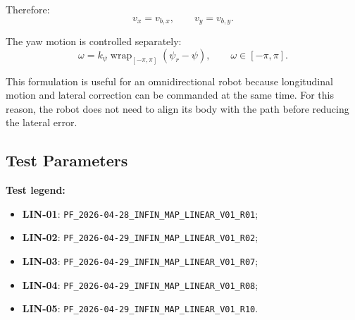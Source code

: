 Therefore:
\begin{equation}
    v_x = v_{b,x},
    \qquad
    v_y = v_{b,y}.
\end{equation}

The yaw motion is controlled separately:
\begin{equation}
    \omega
    =
    k_{\psi}
    \operatorname{wrap}_{[-\pi,\pi]}\!\left(\psi_{r}-\psi\right),
    \qquad
    \omega\in[-\pi,\pi].
\end{equation}

This formulation is useful for an omnidirectional robot because longitudinal
motion and lateral correction can be commanded at the same time. For this
reason, the robot does not need to align its body with the path before reducing
the lateral error.

\subsection{Test Parameters}

\noindent
  \textbf{Test legend:}
  \begin{itemize}
      \item \textbf{LIN-01}: \texttt{PF\_2026-04-28\_INFIN\_MAP\_LINEAR\_V01\_R01};
      \item \textbf{LIN-02}: \texttt{PF\_2026-04-29\_INFIN\_MAP\_LINEAR\_V01\_R02};
      \item \textbf{LIN-03}: \texttt{PF\_2026-04-29\_INFIN\_MAP\_LINEAR\_V01\_R07};
      \item \textbf{LIN-04}: \texttt{PF\_2026-04-29\_INFIN\_MAP\_LINEAR\_V01\_R08};
      \item \textbf{LIN-05}: \texttt{PF\_2026-04-29\_INFIN\_MAP\_LINEAR\_V01\_R10}.
  \end{itemize}

